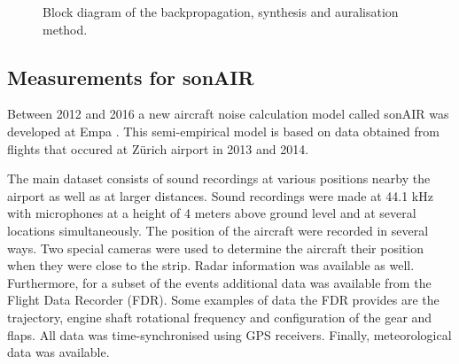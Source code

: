 \documentclass[10pt,twocolumn]{article}
\begin{document}
\begin{figure}[H]
  \centering
  \caption{Block diagram of the backpropagation, synthesis and auralisation method.}
  \label{fig:tool:backpropagation:introduction:block-diagram}
\end{figure}

\subsection{Measurements for sonAIR}\label{sec:introduction:sonair}
Between 2012 and 2016 a new aircraft noise calculation model called sonAIR was
developed at Empa \cite{Zellmann2013,Zellmann2016}. This semi-empirical model is
based on data obtained from flights that occured at Z\"{u}rich airport in 2013 and
2014.

The main dataset consists of sound recordings at various positions nearby the
airport as well as at larger distances. Sound recordings were made at 44.1 kHz with
microphones at a height of 4 meters above ground level and at several locations
simultaneously. The position of the aircraft were recorded in several ways. Two
special cameras were used to determine the aircraft their position when they
were close to the strip. Radar information was available as well. Furthermore,
for a subset of the events additional data was available from the Flight Data
Recorder (FDR). Some examples of data the FDR provides are the trajectory,
engine shaft rotational frequency and configuration of the gear and flaps. All
data was time-synchronised using GPS receivers. Finally, meteorological data was
available.
\end{document}
